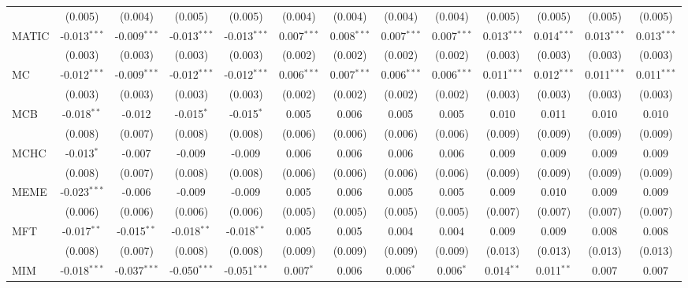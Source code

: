 \begin{table}[!htbp]
\begin{tabular}{@{\extracolsep{5pt}}lcccccccccccc}
  & (0.005) & (0.004) & (0.005) & (0.005) & (0.004) & (0.004) & (0.004) & (0.004) & (0.005) & (0.005) & (0.005) & (0.005) \\
 MATIC & -0.013$^{***}$ & -0.009$^{***}$ & -0.013$^{***}$ & -0.013$^{***}$ & 0.007$^{***}$ & 0.008$^{***}$ & 0.007$^{***}$ & 0.007$^{***}$ & 0.013$^{***}$ & 0.014$^{***}$ & 0.013$^{***}$ & 0.013$^{***}$ \\
  & (0.003) & (0.003) & (0.003) & (0.003) & (0.002) & (0.002) & (0.002) & (0.002) & (0.003) & (0.003) & (0.003) & (0.003) \\
 MC & -0.012$^{***}$ & -0.009$^{***}$ & -0.012$^{***}$ & -0.012$^{***}$ & 0.006$^{***}$ & 0.007$^{***}$ & 0.006$^{***}$ & 0.006$^{***}$ & 0.011$^{***}$ & 0.012$^{***}$ & 0.011$^{***}$ & 0.011$^{***}$ \\
  & (0.003) & (0.003) & (0.003) & (0.003) & (0.002) & (0.002) & (0.002) & (0.002) & (0.003) & (0.003) & (0.003) & (0.003) \\
 MCB & -0.018$^{**}$ & -0.012$^{}$ & -0.015$^{*}$ & -0.015$^{*}$ & 0.005$^{}$ & 0.006$^{}$ & 0.005$^{}$ & 0.005$^{}$ & 0.010$^{}$ & 0.011$^{}$ & 0.010$^{}$ & 0.010$^{}$ \\
  & (0.008) & (0.007) & (0.008) & (0.008) & (0.006) & (0.006) & (0.006) & (0.006) & (0.009) & (0.009) & (0.009) & (0.009) \\
 MCHC & -0.013$^{*}$ & -0.007$^{}$ & -0.009$^{}$ & -0.009$^{}$ & 0.006$^{}$ & 0.006$^{}$ & 0.006$^{}$ & 0.006$^{}$ & 0.009$^{}$ & 0.009$^{}$ & 0.009$^{}$ & 0.009$^{}$ \\
  & (0.008) & (0.007) & (0.008) & (0.008) & (0.006) & (0.006) & (0.006) & (0.006) & (0.009) & (0.009) & (0.009) & (0.009) \\
 MEME & -0.023$^{***}$ & -0.006$^{}$ & -0.009$^{}$ & -0.009$^{}$ & 0.005$^{}$ & 0.006$^{}$ & 0.005$^{}$ & 0.005$^{}$ & 0.009$^{}$ & 0.010$^{}$ & 0.009$^{}$ & 0.009$^{}$ \\
  & (0.006) & (0.006) & (0.006) & (0.006) & (0.005) & (0.005) & (0.005) & (0.005) & (0.007) & (0.007) & (0.007) & (0.007) \\
 MFT & -0.017$^{**}$ & -0.015$^{**}$ & -0.018$^{**}$ & -0.018$^{**}$ & 0.005$^{}$ & 0.005$^{}$ & 0.004$^{}$ & 0.004$^{}$ & 0.009$^{}$ & 0.009$^{}$ & 0.008$^{}$ & 0.008$^{}$ \\
  & (0.008) & (0.007) & (0.008) & (0.008) & (0.009) & (0.009) & (0.009) & (0.009) & (0.013) & (0.013) & (0.013) & (0.013) \\
 MIM & -0.018$^{***}$ & -0.037$^{***}$ & -0.050$^{***}$ & -0.051$^{***}$ & 0.007$^{*}$ & 0.006$^{}$ & 0.006$^{*}$ & 0.006$^{*}$ & 0.014$^{**}$ & 0.011$^{**}$ & 0.007$^{}$ & 0.007$^{}$ \\

\end{tabular}
\end{table}

